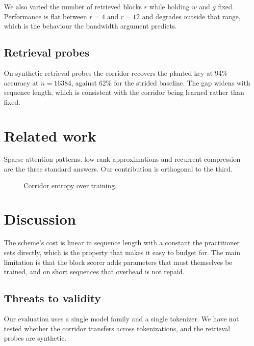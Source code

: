 \documentclass[11pt,twocolumn]{article}
\begin{document}
We also varied the number of retrieved blocks $r$ while holding $w$ and $g$
fixed. Performance is flat between $r=4$ and $r=12$ and degrades outside that
range, which is the behaviour the bandwidth argument predicts.

\vspace{13.2cm}
\subsection{Retrieval probes}
On synthetic retrieval probes the corridor recovers the planted key at 94\%
accuracy at $n=16384$, against 62\% for the strided baseline. The gap widens
with sequence length, which is consistent with the corridor being learned rather
than fixed.

\section{Related work}
Sparse attention patterns, low-rank approximations and recurrent compression are
the three standard answers. Our contribution is orthogonal to the third.

\begin{figure}[p]
\centering
{}
\caption{Corridor entropy over training.}
\label{fig:entropy}
\end{figure}

\section{Discussion}
The scheme's cost is linear in sequence length with a constant the practitioner
sets directly, which is the property that makes it easy to budget for. The main
limitation is that the block scorer adds parameters that must themselves be
trained, and on short sequences that overhead is not repaid.

\subsection{Threats to validity}
Our evaluation uses a single model family and a single tokenizer. We have not
tested whether the corridor transfers across tokenizations, and the retrieval
probes are synthetic.
\end{document}
